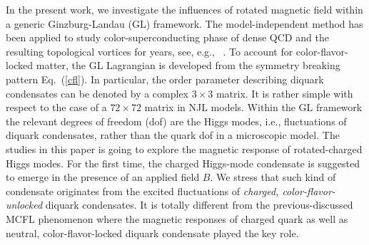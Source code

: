 \documentclass[12pt]{article}
\begin{document}
In the present work, we investigate the influences of rotated magnetic field within a generic Ginzburg-Landau (GL) framework. The model-independent method has been applied to study color-superconducting phase of dense QCD and the resulting 
topological vortices for years, see, e.g., ~\cite{giannakis2002ginzburg,iida2002superfluid,balachandran2006semisuperfluid,nakano2008non,eto2014vortices,zhang2015magnetic}.
To account for color-flavor-locked matter, the GL Lagrangian is developed from the symmetry breaking pattern Eq.~(\ref{cfl}).
In particular, the order parameter describing diquark condensates can be denoted by a complex $3\times3$ matrix. It is rather simple with respect to the case of a $72 \times 72$ matrix in NJL models. Within the GL framework the relevant degrees of freedom (dof) are the Higgs modes, i.e., fluctuations of diquark condensates, rather than the quark dof in a microscopic model.
The studies in this paper is going to explore the magnetic response of rotated-charged Higgs modes. 
For the first time, the charged Higgs-mode condensate is suggested to emerge in the presence of an applied field $B$.
We stress that such kind of condensate originates from the excited fluctuations of \emph{charged, color-flavor-unlocked} diquark condensates. It is totally different from the previous-discussed MCFL phenomenon where the magnetic responses of charged quark as well as neutral, color-flavor-locked diquark condensate played the key role.
\end{document}

